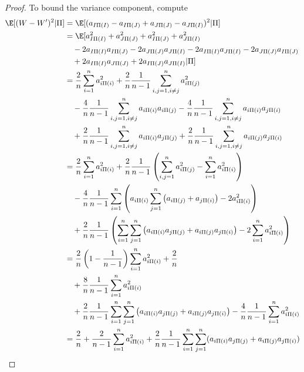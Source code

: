 \begin{theorem}
\begin{proof}
    To bound the variance component, compute
    \begin{equation}
      \begin{split}
        \E [(W-W')^2 | \Pi] 
        &= \E[(a_{I \Pi(I)} - a_{I \Pi(J)} + a_{J \Pi(J)} - a_{J \Pi(I)})^2 | \Pi] \\
        &= \E[ a_{I \Pi(I)}^2 + a_{J \Pi(J)}^2 + a_{I \Pi(J)}^2 + a_{J \Pi(I)}^2 \\
        &\quad - 2a_{I \Pi(I)} a_{I \Pi(J)} - 2a_{J \Pi(J)} a_{J \Pi(I)}
        - 2a_{I \Pi(I)} a_{J \Pi(I)} - 2a_{J \Pi(J)} a_{I \Pi(J)} \\
        &\quad + 2a_{I \Pi(I)} a_{J \Pi(J)} + 2a_{I \Pi(J)} a_{J \Pi(I)} | \Pi ] \\
        &= \frac{2}{n} \sum_{i=1}^n a_{i \Pi(i)}^2 
        + \frac{2}{n}\frac{1}{n-1}\sum_{i,j=1, i\neq j}^n a_{i \Pi(j)}^2 \\
        &\quad - \frac{4}{n}\frac{1}{n-1}\sum_{i,j=1, i\neq j}^n a_{i \Pi(i)}a_{i \Pi(j)}
        - \frac{4}{n}\frac{1}{n-1}\sum_{i,j=1, i\neq j}^n a_{i \Pi(i)}a_{j \Pi(i)} \\
        &\quad + \frac{2}{n}\frac{1}{n-1}\sum_{i,j=1, i\neq j}^n a_{i \Pi(i)}a_{j \Pi(j)}
        + \frac{2}{n}\frac{1}{n-1}\sum_{i,j=1, i\neq j}^n a_{i \Pi(j)}a_{j \Pi(i)} \\
        &= \frac{2}{n} \sum_{i=1}^n a_{i \Pi(i)}^2 
        + \frac{2}{n}\frac{1}{n-1} \left ( 
          \sum_{i,j=1}^n a_{i \Pi(j)}^2 - \sum_{i=1}^n a_{i \Pi(i)}^2 \right ) \\
        &\quad - \frac{4}{n}\frac{1}{n-1} \sum_{i=1}^n \left ( a_{i\Pi(i)} 
        \sum_{j=1}^n \left ( a_{i\Pi(j)} + a_{j\Pi(i)} \right ) - 2 a_{i \Pi(i)}^2 
        \right ) \\
        &\quad + \frac{2}{n}\frac{1}{n-1} \left ( \sum_{i=1}^n \sum_{j=1}^n \left ( 
          a_{i\Pi(i)}a_{j\Pi(j)} + a_{i\Pi(j)}a_{j\Pi(i)}
          \right )  - 2 \sum_{i=1}^n a_{i \Pi(i)}^2 \right ) \\
        &= \frac{2}{n}\left ( 1 - \frac{1}{n-1} \right )  \sum_{i=1}^n a_{i \Pi(i)}^2 
        + \frac{2}{n} \\
        &\quad + \frac{8}{n}\frac{1}{n-1} \sum_{i=1}^n a_{i \Pi(i)}^2 \\
        &\quad + \frac{2}{n}\frac{1}{n-1} \sum_{i=1}^n \sum_{j=1}^n \left ( 
          a_{i\Pi(i)}a_{j\Pi(j)} + a_{i\Pi(j)}a_{j\Pi(i)}
        \right ) - \frac{4}{n}\frac{1}{n-1} \sum_{i=1}^n a_{i \Pi(i)}^2 \\
        &= \frac{2}{n} + \frac{2}{n-1}\sum_{i=1}^n a_{i \Pi(i)}^2 + \frac{2}{n}\frac{1}{n-1}
        \sum_{i=1}^n \sum_{j=1}^n (a_{i\Pi(i)}a_{j\Pi(j)} + a_{i\Pi(j)}a_{j\Pi(i)})
      \end{split}
    \end{equation}
  \end{proof}
\end{theorem}